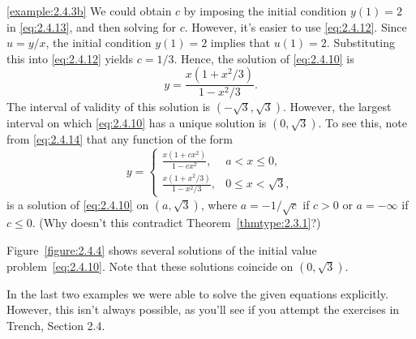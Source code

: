 \documentclass{ximera}
\begin{document}
\begin{example}
\begin{explanation}
\ref{example:2.4.3b}  We could obtain $c$ by imposing
the initial condition $y(1)=2$ in \eqref{eq:2.4.13}, and then solving for
$c$. However, it's easier to use \eqref{eq:2.4.12}. Since $u=y/x$, the
initial
condition
$y(1)=2$ implies that $u(1)=2$.  Substituting this into \eqref{eq:2.4.12}
yields $c=1/3$.  Hence, the solution of \eqref{eq:2.4.10} is
$$
y=\frac{x(1+x^2/3)}{1-x^2/3}.
$$
The interval of validity of this solution is $(-\sqrt{3},\sqrt{3})$.
However, the largest interval on which \eqref{eq:2.4.10} has a unique
solution is $(0,\sqrt{3})$. To see this, note from \eqref{eq:2.4.14}
that any function of the form
\begin{equation} \label{eq:2.4.15}
y=\left\{\begin{array}{ll} \frac{x(1+cx^2)}{1-cx^2},&a<x\leq 0,\\
\frac{x(1+x^2/3)}{1-x^2/3},&0\leq x<\sqrt{3},
\end{array}\right.
\end{equation}
is a solution of \eqref{eq:2.4.10} on $(a,\sqrt{3})$, where $a=-1/\sqrt c$
if $c>0$ or $a=-\infty$ if $c\leq 0$. (Why doesn't this contradict
Theorem~\ref{thmtype:2.3.1}?)


 Figure~\ref{figure:2.4.4} shows several solutions of the
initial value problem~\eqref{eq:2.4.10}. Note that these solutions coincide
on $(0,\sqrt{3})$.
\end{explanation}
\end{example}

In the last two examples we were able to solve the given equations
explicitly.   However, this isn't  always possible, as you'll
see if you attempt the exercises in Trench, Section 2.4.
\end{document}
